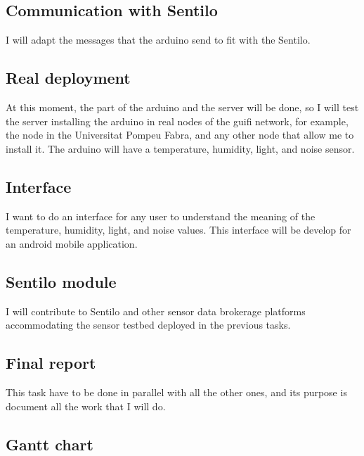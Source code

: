 \subsection{Communication with Sentilo}

I will adapt the messages that the arduino send to fit with the Sentilo.

\subsection{Real deployment}

At this moment, the part of the arduino and the server will be done, so I will test the server installing the arduino in real nodes of the guifi network, for example, the node in the Universitat Pompeu Fabra, and any other node that allow me to install it. The arduino will have a temperature, humidity, light, and noise sensor.

\subsection{Interface}

I want to do an interface for any user to understand the meaning of the temperature, humidity, light, and noise values. This interface will be develop for an android mobile application.

\subsection{Sentilo module}

I will contribute to Sentilo and other sensor data brokerage platforms accommodating the sensor testbed deployed in the previous tasks.

\subsection{Final report}

This task have to be done in parallel with all the other ones, and its purpose is document all the work that I will do.

\subsection{Gantt chart}

